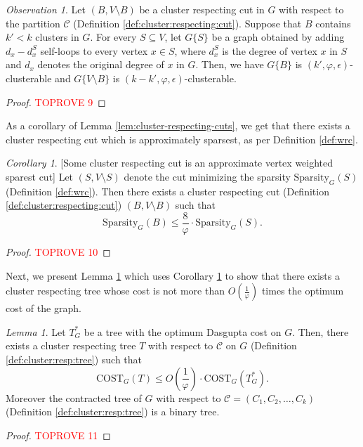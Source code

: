 \documentclass[letterpaper,11pt]{article}
\newcommand{\spp}{\text{Sparsity}}
\newcommand{\CT}{\text{COST}}
\newcommand{\cC}{\mathcal{C}}
\theoremstyle{plain}
\theoremstyle{definition}
\theoremstyle{remark}
\newtheorem{lemmma}{Lemma}
\newtheorem{mycor}{Corollary}
\newtheorem{observation}{Observation}
\newcommand{\e}{\epsilon}
\begin{document}
\begin{observation} \label{obs:inherit}
	 Let $(B, V\setminus B)$ be a cluster 
	respecting cut in $G$  with respect to the partition $\cC$ (Definition \ref{def:cluster:respecting:cut}). Suppose that $B$ contains 
	$k' < k$ clusters in $G$.  For every $S\subseteq V$, let $G\{S\}$ be a graph obtained by adding  $d_x - d^S_x$ self-loops to every 
	vertex $x\in S$, where $d^S_x$ is the degree of vertex $x$ in $S$ and $d_x$ denotes the original degree of $x$ in $G$. Then, 
	we have $G\{B\}$ is $(k', \varphi, \e)$-clusterable and $G\{V\setminus B\}$ is $(k-k', \varphi, \e)$-clusterable.
\end{observation}
\begin{proof}\textcolor{red}{TOPROVE 9}\end{proof}


As a corollary of Lemma \ref{lem:cluster-respecting-cuts}, we get that there exists a cluster respecting cut which is approximately sparsest, as per Definition \ref{def:wrc}. 
\begin{mycor}\label{cor:wrc}[Some cluster respecting cut is an approximate vertex weighted sparest cut] 
  Let $(S, V \setminus S)$ denote the cut minimizing the sparsity $\spp_G(S)$ (Definition \ref{def:wrc}).
     Then there exists a cluster respecting cut
	(Definition \ref{def:cluster:respecting:cut}) $(B, V \setminus B)$ such that
    $$\spp_G(B) \leq  \frac{8}{\varphi} \cdot \spp_G(S)\text{.}$$
\end{mycor}
\begin{proof}\textcolor{red}{TOPROVE 10}\end{proof}

Next, we present Lemma \ref{lem:optimum-respects-clusters}  which uses Corollary \ref{cor:wrc} to show that there exists a cluster respecting tree whose cost is not more than $O\left(\frac{1}{\varphi} \right)$ times the optimum cost of the graph.


\begin{lemmma} \label{lem:optimum-respects-clusters}
	Let $T^*_G$ be a tree with the optimum Dasgupta cost on $G$. Then, there exists a cluster respecting tree 
	$T$ with respect to $\cC$ on $G$ (Definition \ref{def:cluster:resp:tree}) such that 
	\[\CT_G(T) \leq O\left(\frac{1}{\varphi}\right)\cdot \CT_G(T^*_G) \text{.}\]
	Moreover the contracted tree of $G$ with respect to $\cC = (C_1, C_2, \ldots, C_k)$ 
	(Definition \ref{def:cluster:resp:tree}) is a binary tree.
\end{lemmma}
\begin{proof}\textcolor{red}{TOPROVE 11}\end{proof}
\end{document}
